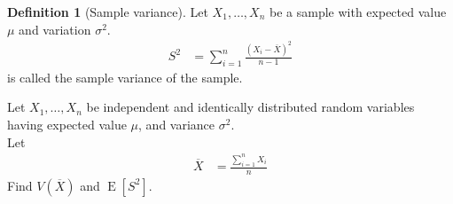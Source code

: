 \documentclass[titlepage, fleqn, a4paper, 12pt, twoside]{article}
\theoremstyle{definition}
\newtheorem{definition}{Definition}
\theoremstyle{theorem}
\DeclareMathOperator{\expct}{\mathrm{E}}
\begin{document}
\begin{definition}[Sample variance]
	Let $X_1,\dots,X_n$ be a sample with expected value $\mu$ and variation $\sigma^2$.
	\begin{align*}
		S^2 & = \sum\limits_{i = 1}^{n} \frac{\left( X_i - \overline{X} \right)^2}{n - 1}
	\end{align*}
	is called the sample variance of the sample.
\end{definition}

\begin{question}
	Let $X_1,\dots,X_n$ be independent and identically distributed random variables having expected value $\mu$, and variance $\sigma^2$.\\
	Let
	\begin{align*}
		\overline{X} & = \frac{\sum\limits_{i = 1}^{n} X_i}{n}
	\end{align*}
	Find $V\left( \overline{X} \right)$ and $\expct\left[ S^2 \right]$.
\end{question}
\end{document}
